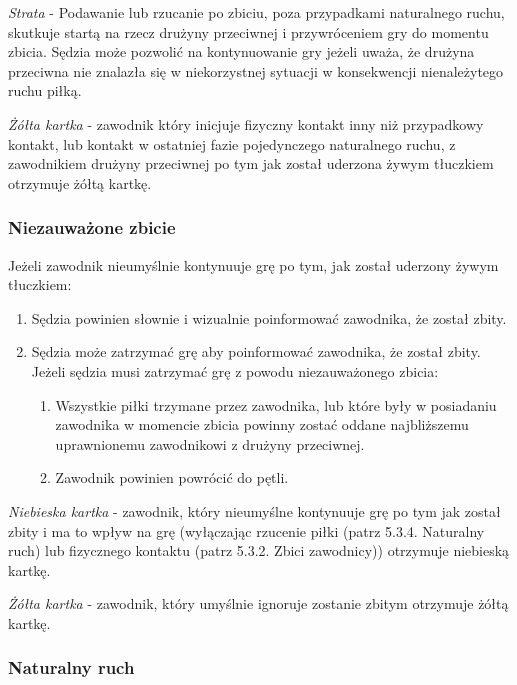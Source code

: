 \documentclass[12pt]{article}
\begin{document}
\emph{Strata} - Podawanie lub rzucanie po zbiciu, poza przypadkami
naturalnego ruchu, skutkuje startą na rzecz drużyny przeciwnej i
przywróceniem gry do momentu zbicia. Sędzia może pozwolić na
kontynuowanie gry jeżeli uważa, że drużyna przeciwna nie znalazła się w
niekorzystnej sytuacji w konsekwencji nienależytego ruchu piłką.

\emph{Żółta kartka} - zawodnik który inicjuje fizyczny kontakt inny niż
przypadkowy kontakt, lub kontakt w ostatniej fazie pojedynczego
naturalnego ruchu, z zawodnikiem drużyny przeciwnej po tym jak został
uderzona żywym tłuczkiem otrzymuje żółtą kartkę.

\subsubsection{Niezauważone zbicie}

Jeżeli zawodnik nieumyślnie kontynuuje grę po tym, jak został uderzony
żywym tłuczkiem:
\begin{enumerate}
	\item Sędzia powinien słownie i wizualnie poinformować zawodnika, że został
	      zbity.

	\item Sędzia może zatrzymać grę aby poinformować zawodnika, że został
	      zbity. Jeżeli sędzia musi zatrzymać grę z powodu niezauważonego zbicia:
	      \begin{enumerate}
		      \item Wszystkie piłki trzymane przez zawodnika, lub które były w posiadaniu
		            zawodnika w momencie zbicia powinny zostać oddane najbliższemu
		            uprawnionemu zawodnikowi z drużyny przeciwnej.

		      \item Zawodnik powinien powrócić do pętli.
	      \end{enumerate}
\end{enumerate}

\emph{Niebieska kartka} - zawodnik, który nieumyślne kontynuuje grę po
tym jak został zbity i ma to wpływ na grę (wyłączając rzucenie piłki
(patrz 5.3.4. Naturalny ruch) lub fizycznego kontaktu (patrz 5.3.2.
Zbici zawodnicy)) otrzymuje niebieską kartkę.

\emph{Żółta kartka} - zawodnik, który umyślnie ignoruje zostanie zbitym
otrzymuje żółtą kartkę.

\subsubsection{Naturalny ruch}
\end{document}

